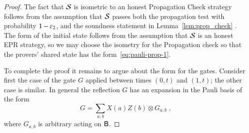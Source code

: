 \begin{proof}
The fact that $\mathcal{S}$ is isometric to an honest Propagation Check strategy follows from the assumption that  $\mathcal{S}$ passes both the propagation test with probability $1-\varepsilon_2$, and the soundness statement in Lemma~\ref{lem:prop_check} . The form of the initial state follows from the assumption that $\mathcal{S}$ is an honest EPR strategy, so we may choose the isometry for the Propagation check so that the provers' shared state has the form~\eqref{eq:pauli-prop-1}. 

To complete the proof it remains to argue about the form for the gates. Consider first the case of the gate $G$ applied between times $(0,t)$ and $(1,t)$; the other case is similar. In general the reflection $G$ has an expansion in the Pauli basis of the form 
$$ G = \sum_{a,b} X(a)Z(b)\otimes G_{a,b}\;,$$
where $G_{a,b}$ is arbitrary acting on ${\mathsf{B}}$. 



\end{proof}
